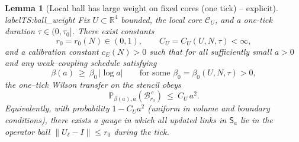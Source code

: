 \documentclass[11pt]{amsart}
\theoremstyle{plain}
\newtheorem{lemma}[theorem]{Lemma}
\theoremstyle{definition}
\theoremstyle{remark}
\begin{document}
\begin{lemma}[Local ball has large weight on fixed cores (one tick) -- explicit]\\label{TS:ball_weight}
Fix $U\subset\mathbb R^4$ bounded, the local core $\mathcal C_U$, and a one-tick duration $\tau\in(0,\tau_0]$. There exist constants
\[
r_0=r_0(N)\in(0,1),\qquad C_U=C_U(U,N,\tau)<\infty,
\]
and a calibration constant $c_E(N)>0$ such that for all sufficiently small $a>0$ and any weak–coupling schedule satisfying
\begin{equation}
\label{eq:schedule}
\beta(a)\ \ge\ \beta_0\,|\log a|\qquad\text{for some }\beta_0=\beta_0(U,N,\tau)>0,
\end{equation}
the one--tick Wilson transfer on the stencil obeys
\begin{equation}
\label{eq:ball_prob_final}
\mathbb P_{\beta(a),a}\!\left(\mathcal B_{r_0}^{\,c}\right)\ \le\ C_U\,a^2.
\end{equation}
Equivalently, with probability $1-C_U a^2$ (uniform in volume and boundary conditions), there exists a gauge in which all updated links in $\mathsf S_a$ lie in the operator ball $\|U_\ell-I\|\le r_0$ during the tick.
\end{lemma}
\end{document}
